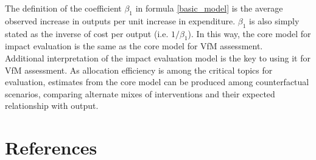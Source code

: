 \documentclass[twocolumn]{bmcart}%
\begin{document}
The definition of the coefficient $\beta_1$ in formula \ref{basic_model} is the average observed increase in outputs per unit increase in expenditure. $\beta_1$ is also simply stated as the inverse of cost per output (i.e. $1/\beta_1$). In this way, the core model for impact evaluation is the same as the core model for VfM assessment. \\

Additional interpretation of the impact evaluation model is the key to using it for VfM assessment. As allocation efficiency is among the critical topics for evaluation, estimates from the core model can be produced among counterfactual scenarios, comparing alternate mixes of interventions and their expected relationship with output.\\


\section{References}
\end{document}
